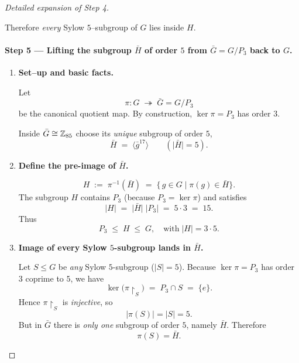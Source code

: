 \documentclass[12pt]{article}
\theoremstyle{definition} %
\theoremstyle{plain} %
\begin{document}
\begin{proof}[Detailed expansion of Step 4]
\begin{enumerate}
        Therefore \emph{every} Sylow $5$–subgroup of $G$ lies inside $H$.

\paragraph{Step 5 — Lifting the subgroup \(\bar{H}\) of order \(5\) from \(\bar{G}=G/P_{3}\) back to \(G\).}

\begin{enumerate}
\item \textbf{Set–up and basic facts.}

      Let
      \[
          \pi : G \;\twoheadrightarrow\; \bar{G}=G/P_{3}
      \]
      be the canonical quotient map.  
      By construction, \(\ker\pi = P_{3}\) has order \(3\).

      Inside \(\bar{G}\cong\Bbb Z_{85}\) choose its \emph{unique}
      subgroup of order \(5\),
      \[
          \bar{H}\;=\;\langle\bar{g}^{17}\rangle
          \qquad(\lvert\bar{H}\rvert = 5).
      \]

\item \textbf{Define the pre-image of \(\bar{H}\).}

      \[
          H \;:=\; \pi^{-1}(\bar{H})
          \;=\;
          \bigl\{\,g\in G \mid \pi(g)\in\bar{H}\bigr\}.
      \]
      The subgroup \(H\) contains \(P_{3}\) (because \(P_{3}=\ker\pi\))
      and satisfies
      \[
          \lvert H\rvert
          \;=\;
          \lvert\bar{H}\rvert\;\lvert P_{3}\rvert
          \;=\;
          5\cdot 3
          \;=\;
          15.
      \]
      Thus
      \[
          P_{3}\;\le\;H\;\le\;G,
          \quad
          \text{with}\;
          \lvert H\rvert = 3\cdot5 .
      \]

\item \textbf{Image of every Sylow \(5\)-subgroup lands in \(\bar{H}\).}

      Let \(S\le G\) be \emph{any} Sylow \(5\)-subgroup (\(\lvert S\rvert =5\)).
      Because \(\ker\pi = P_{3}\) has order \(3\) coprime to \(5\),
      we have
      \[
          \ker\bigl(\pi{\restriction_{S}}\bigr)
          \;=\;
          P_{3}\cap S
          \;=\;\{e\}.
      \]
      Hence \(\pi{\restriction_{S}}\) is \emph{injective}, so
      \[
          \lvert\pi(S)\rvert = \lvert S\rvert = 5.
      \]
      But in \(\bar{G}\) there is \emph{only one} subgroup of order \(5\),
      namely \(\bar{H}\).  Therefore
      \[
          \pi(S)=\bar{H}.
      \]


\end{enumerate}
\end{enumerate}
\end{proof}
\end{document}
